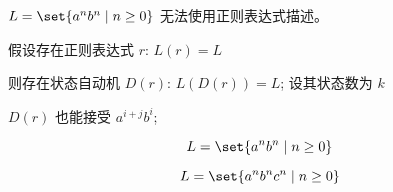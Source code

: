\begin{frame}{}
  \begin{theorem}
    $L = \set{a^{n} b^{n} \mid n \ge 0}$ 无法使用正则表达式描述。
  \end{theorem}

  \pause
  \begin{center}

    \pause
    \vspace{0.30cm}
    假设存在正则表达式 $r$: $L(r) = L$

    \pause
    \vspace{0.30cm}
    则存在状态自动机 $D(r)$: $L(D(r)) = L$; 设其状态数为 $k$

    \pause
    \vspace{0.30cm}

    \pause
    \vspace{0.30cm}
    $D(r)$ 也能接受 $a^{i+j} b^{i}$; 
  \end{center}
\end{frame}

\begin{frame}{}
  \begin{center}
    \[
      L = \set{a^{n}b^{n} \mid n \ge 0}
    \]
    \href{https://en.wikipedia.org/wiki/Pumping\_lemma\_for\_regular\_languages}{
      }

    \pause
    \vspace{0.60cm}
    \[
      L = \set{a^{n}b^{n}c^{n} \mid n \ge 0}
    \]
    \href{https://en.wikipedia.org/wiki/Pumping\_lemma\_for\_context-free\_languages}{
      }
  \end{center}
\end{frame}
